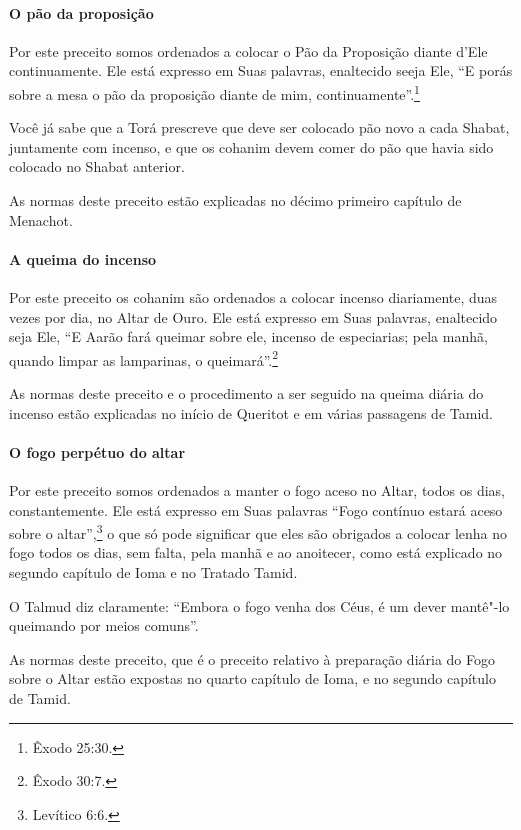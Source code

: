 \begin{multicols}{2}
\paragraph{O pão da proposição}

Por este preceito somos ordenados a colocar o Pão da Proposição diante
d'Ele continuamente. Ele está expresso em Suas palavras, enaltecido
seeja Ele, ``E porás sobre a mesa o pão da proposição diante de mim,
continuamente''.\footnote{Êxodo 25:30.}

Você já sabe que a Torá\starr{} prescreve que deve ser colocado pão novo a cada Shabat, juntamente com incenso, e que os cohanim\starr{} devem
comer do pão que havia sido colocado no Shabat anterior.

As normas deste preceito estão explicadas no décimo primeiro capítulo
de Menachot\starr.

\paragraph{A queima do incenso}

Por este preceito os cohanim\starr{} são ordenados a colocar incenso
diariamente, duas vezes por dia, no Altar de Ouro. Ele está expresso em
Suas palavras, enaltecido seja Ele, ``E Aarão fará queimar sobre ele,
incenso de especiarias; pela manhã, quando limpar as lamparinas, o
queimará''.\footnote{Êxodo 30:7.}

As normas deste preceito e o procedimento a ser seguido na queima diária
do incenso estão explicadas no início de Queritot\starr{} e em várias passagens
de Tamid\starr.

\paragraph{O fogo perpétuo do altar}

Por este preceito somos ordenados a manter o fogo aceso no Altar, todos
os dias, constantemente. Ele está expresso em Suas palavras ``Fogo
contínuo estará aceso sobre o altar'',\footnote{Levítico 6:6.} o que só pode
significar que eles são obrigados a colocar lenha no fogo todos os dias,
sem falta, pela manhã e ao anoitecer, como está explicado no segundo
capítulo de Ioma\starr{} e no Tratado Tamid\starr.

O Talmud\starr{} diz claramente: ``Embora o fogo venha dos Céus, é um dever
mantê"-lo queimando por meios comuns''.

As normas deste preceito, que é o preceito relativo à preparação diária
do Fogo sobre o Altar estão expostas no quarto capítulo de Ioma\starr, e no
segundo capítulo de Tamid\starr.


\end{multicols}
